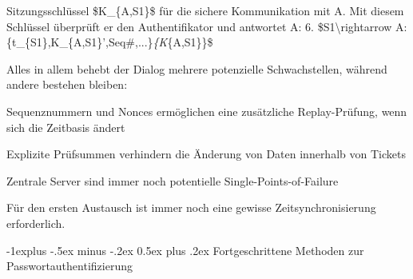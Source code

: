 \documentclass[a4paper]{article}
\makeatletter
\renewcommand{\subsection}{\@startsection{subsection}{2}{0mm}%
 {-1explus -.5ex minus -.2ex}%
 {0.5ex plus .2ex}%
 {\normalfont\normalsize\bfseries}}
\makeatother
\begin{document}
\begin{multicols}{3}
\begin{itemize*}
            Sitzungsschlüssel \$K\_\{A,S1\}\$ für die sichere Kommunikation mit A.
            Mit diesem Schlüssel überprüft er den Authentifikator und antwortet A:
            6. \$S1\textbackslash rightarrow
            A:\{t\_\{S1\},K\_\{A,S1\}',Seq\#,...\}\emph{\{K}\{A,S1\}\}\$
            \item Alles in allem behebt der Dialog mehrere potenzielle Schwachstellen,
            während andere bestehen bleiben:
            \begin{itemize*}
                  \item Sequenznummern und Nonces ermöglichen eine zusätzliche Replay-Prüfung, wenn sich die Zeitbasis ändert
                  \item Explizite Prüfsummen verhindern die Änderung von Daten innerhalb von Tickets
                  \item Zentrale Server sind immer noch potentielle Single-Points-of-Failure
                  \item Für den ersten Austausch ist immer noch eine gewisse Zeitsynchronisierung erforderlich.
            \end{itemize*}
      \end{itemize*}


      \subsection{Fortgeschrittene Methoden zur
            Passwortauthentifizierung}


\end{multicols}
\end{document}

